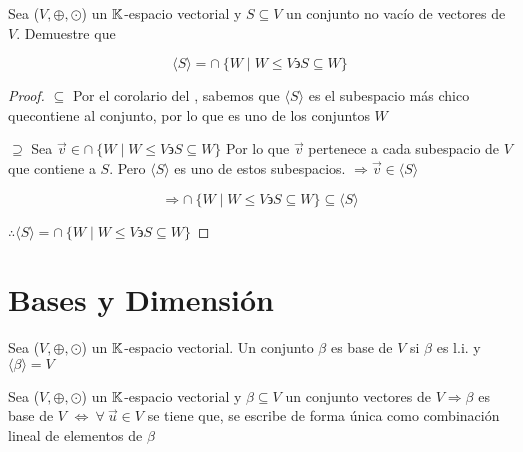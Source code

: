 \begin{theorem}
    
Sea ($V, \oplus, \odot$)  un $\mathbb{K}$-espacio vectorial y $S \subseteq V$ un conjunto no vacío de vectores de $V$. Demuestre que

\begin{equation*}
    \langle S \rangle = \cap \: \{ W \mid W \leq V \backepsilon S \subseteq W \}
\end{equation*}
\end{theorem}
\begin{proof}

    $\subseteq$ Por el corolario del , sabemos que  $\langle S \rangle$ es el subespacio más chico quecontiene al conjunto, por lo que es uno de los conjuntos $W$

    $\supseteq$ Sea $\vec{v} \in \cap \: \{ W \mid W \leq V \backepsilon S \subseteq W \}$ Por lo que $\vec{v} $ pertenece a cada subespacio de $V$ que contiene a $S$. Pero $\langle S \rangle$ es uno de estos subespacios. $\Rightarrow \vec{v} \in  \langle S \rangle $

    $$\Rightarrow \cap \: \{ W \mid W \leq V \backepsilon S \subseteq W \} \subseteq \langle S \rangle$$

    $\therefore \langle S \rangle = \cap \: \{ W \mid W \leq V \backepsilon S \subseteq W \}$ 

\end{proof}


\section{Bases y Dimensión}

\begin{definition}[Bases]
        Sea ($V, \oplus, \odot$) un $\mathbb{K}$-espacio vectorial. Un conjunto $\beta$ es base de $V$ si $\beta$ es l.i. y $\langle \beta \rangle = V$
\end{definition}

\begin{theorem} \label{teo14}
    Sea ($V, \oplus, \odot$) un $\mathbb{K}$-espacio vectorial y $\beta \subseteq V$ un conjunto vectores de $V \Rightarrow \beta$ es base de $V$  $\Leftrightarrow \: \forall \: \vec{u} \in V$ se tiene que, se escribe de forma única como combinación lineal de elementos de $\beta$
\end{theorem}

